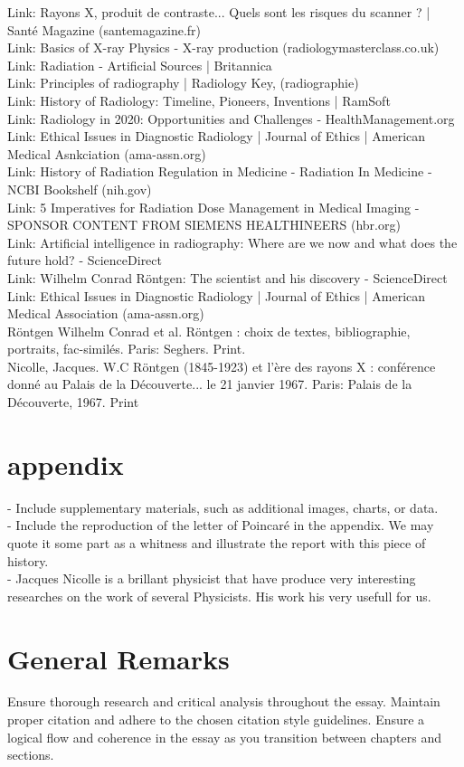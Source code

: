 \documentclass[a4paper,12pt]{report}
\begin{document}
Link: Rayons X, produit de contraste... Quels sont les risques du scanner ? | Santé Magazine (santemagazine.fr)  \\
Link: Basics of X-ray Physics - X-ray production (radiologymasterclass.co.uk) \\
Link: Radiation - Artificial Sources | Britannica  \\
Link: Principles of radiography | Radiology Key, (radiographie) \\
Link: History of Radiology: Timeline, Pioneers, Inventions | RamSoft \\
Link: Radiology in 2020: Opportunities and Challenges - HealthManagement.org \\
Link: Ethical Issues in Diagnostic Radiology | Journal of Ethics | American Medical Asnkciation (ama-assn.org) \\
Link: History of Radiation Regulation in Medicine - Radiation In Medicine - NCBI Bookshelf (nih.gov) \\
Link: 5 Imperatives for Radiation Dose Management in Medical Imaging - SPONSOR CONTENT FROM SIEMENS HEALTHINEERS (hbr.org) \\
Link: Artificial intelligence in radiography: Where are we now and what does the future hold? - ScienceDirect \\
Link: Wilhelm Conrad Röntgen: The scientist and his discovery - ScienceDirect \\
Link: Ethical Issues in Diagnostic Radiology | Journal of Ethics | American Medical Association (ama-assn.org) \\

Röntgen Wilhelm Conrad et al. Röntgen : choix de textes, bibliographie, portraits, fac-similés. Paris: Seghers. Print. \\

Nicolle, Jacques. W.C Röntgen (1845-1923) et l'ère des rayons X : conférence donné au Palais de la Découverte... le 21 janvier 1967. Paris: Palais de la Découverte, 1967. Print \\
\printbibliography
\appendix
\section*{\Huge{appendix}}
- Include supplementary materials, such as additional images, charts, or data.\\
- Include the reproduction of the letter of Poincaré in the appendix. We may quote it some part as a whitness and illustrate the report with this piece of history. \\
- Jacques Nicolle is a brillant physicist that have produce very interesting researches on the work of several Physicists. His work his very usefull for us.
\section*{General Remarks}
Ensure thorough research and critical analysis throughout the essay. Maintain proper citation and adhere to the chosen citation style guidelines. Ensure a logical flow and coherence in the essay as you transition between chapters and sections.
\end{document}
